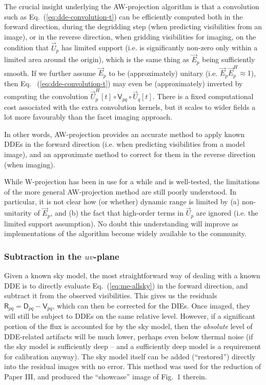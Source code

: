 \documentclass[referee]{aa}
\newcommand{\herm}{H}
\newcommand{\jones}[2]{\vec {#1}_{#2}}
\newcommand{\jonesT}[2]{\vec {#1}^{\herm}_{#2}}
\newcommand{\coh}[2]{\mathsf{{#1}}_{{#2}}}
\begin{document}
The crucial insight underlying the AW-projection algorithm is that a convolution such as Eq.~(\ref{eq:dde-convolution-t}) can be efficiently computed both in the forward direction, during the degridding step (when predicting visibilities from an image), or in the reverse direction, when gridding visibilities for imaging, on the condition that $\jones{U}{p}$ has limited support (i.e. is significantly non-zero only within a limited area around the origin), which is the same thing as $\jones{E}{p}$ being sufficiently smooth. If we further assume $\jones{E}{p}$ to be (approximately) unitary (i.e. $\jones{E}{p}\jonesT{E}{p}\approx1$), then Eq. ~(\ref{eq:dde-convolution-t}) may even be (approximately) inverted by computing the convolution $\jonesT{U}{p}[t] \circ \coh{V}{pq} \circ \jones{U}{q}[t]$. There is a fixed computational cost associated with the extra convolution kernels, but it scales to wider fields a lot more favourably than the facet imaging approach.

In other words, AW-projection provides an accurate method to apply known DDEs in the forward direction (i.e. when predicting visibilities from a model image), and an approximate method to correct for them in the reverse direction (when imaging).

While W-projection has been in use for a while and is well-tested, the limitations of the more general AW-projection method are still poorly understood. In particular, it is not clear how (or whether) dynamic range is limited by (a) non-unitarity of $\jones{E}{p}$, and (b) the fact that high-order terms in $\jones{U}{p}$ are ignored (i.e. the limited support assumption). No doubt this understanding will improve as implementations of the algorithm become widely available to the community.

\subsubsection{Subtraction in the $uv$-plane\label{sec:subtraction-uv-plane}}

Given a known sky model, the most straightforward way of dealing with a known DDE is to directly evaluate Eq.~(\ref{eq:me-allsky}) in the forward direction, and subtract it from the observed visibilities. This gives us the residuals $\coh{R}{pq} = \coh{D}{pq} - \coh{V}{pq}$, which can then be corrected for the DIEs. Once imaged, they will still be subject to DDEs on the same relative level. However, if a significant portion of the flux is accounted for by the sky model, then the \emph{absolute} level of DDE-related artifacts will be much lower, perhaps even below thermal noise (if the sky model is sufficiently deep -- and a sufficiently deep model is a requirement for calibration anyway). The sky model itself can be added (``restored'') directly into the residual images with no error. This method was used for the reduction of Paper III, and produced the ``showcase'' image of Fig.~1 therein.
\end{document}
